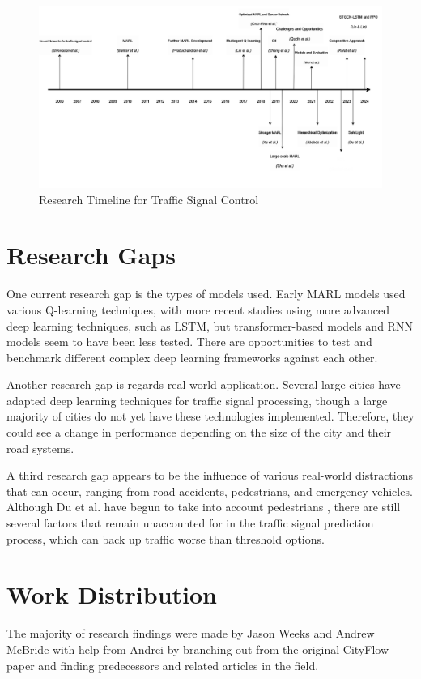 \documentclass[conference]{IEEEtran}
\begin{document}
\begin{figure}[H]
    \centering
    \includegraphics[width=0.9\linewidth]{Diagram Timeline.png}
    \caption{Research Timeline for Traffic Signal Control}
\end{figure}

\section{Research Gaps}
One current research gap is the types of models used. Early MARL models used various Q-learning techniques, with more recent studies using more advanced deep learning techniques, such as LSTM, but transformer-based models and RNN models seem to have been less tested. There are opportunities to test and benchmark different complex deep learning frameworks against each other. 

Another research gap is regards real-world application. Several large cities have adapted deep learning techniques for traffic signal processing, though a large majority of cities do not yet have these technologies implemented. Therefore, they could see a change in performance depending on the size of the city and their road systems. 

A third research gap appears to be the influence of various real-world distractions that can occur, ranging from road accidents, pedestrians, and emergency vehicles. Although Du et al. have begun to take into account pedestrians \cite{13}, there are still several factors that remain unaccounted for in the traffic signal prediction process, which can back up traffic worse than threshold options.

\section*{Work Distribution}
The majority of research findings were made by Jason Weeks and Andrew McBride with help from Andrei by branching out from the original CityFlow paper \cite{7} and finding predecessors and related articles in the field. 
\end{document}
